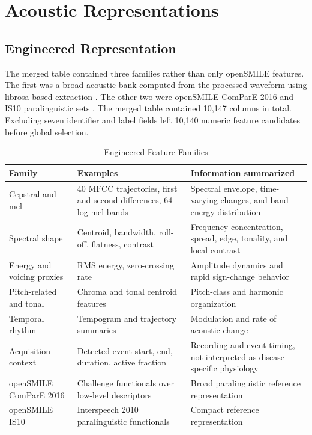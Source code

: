 \documentclass[journal]{IEEEtran}
\begin{document}
\section{Acoustic Representations}

\subsection{Engineered Representation}

The merged table contained three families rather than only openSMILE features. The first was a broad acoustic bank computed from the processed waveform using librosa-based extraction \cite{mcfee2015librosa}. The other two were openSMILE ComParE 2016 and IS10 paralinguistic sets \cite{eyben2010opensmile,schuller2010is10,schuller2016compare}. The merged table contained 10,147 columns in total. Excluding seven identifier and label fields left 10,140 numeric feature candidates before global selection.

\begin{table}[t]
\caption{Engineered Feature Families}
\label{tab:s_features}
\centering
\footnotesize
\begin{tabular}{L{3.0cm}L{4.2cm}L{6.2cm}}
\toprule
Family & Examples & Information summarized \\
\midrule
Cepstral and mel & 40 MFCC trajectories, first and second differences, 64 log-mel bands & Spectral envelope, time-varying changes, and band-energy distribution \\
Spectral shape & Centroid, bandwidth, roll-off, flatness, contrast & Frequency concentration, spread, edge, tonality, and local contrast \\
Energy and voicing proxies & RMS energy, zero-crossing rate & Amplitude dynamics and rapid sign-change behavior \\
Pitch-related and tonal & Chroma and tonal centroid features & Pitch-class and harmonic organization \\
Temporal rhythm & Tempogram and trajectory summaries & Modulation and rate of acoustic change \\
Acquisition context & Detected event start, end, duration, active fraction & Recording and event timing, not interpreted as disease-specific physiology \\
openSMILE ComParE 2016 & Challenge functionals over low-level descriptors & Broad paralinguistic reference representation \\
openSMILE IS10 & Interspeech 2010 paralinguistic functionals & Compact reference representation \\
\bottomrule
\end{tabular}
\end{table}
\end{document}
